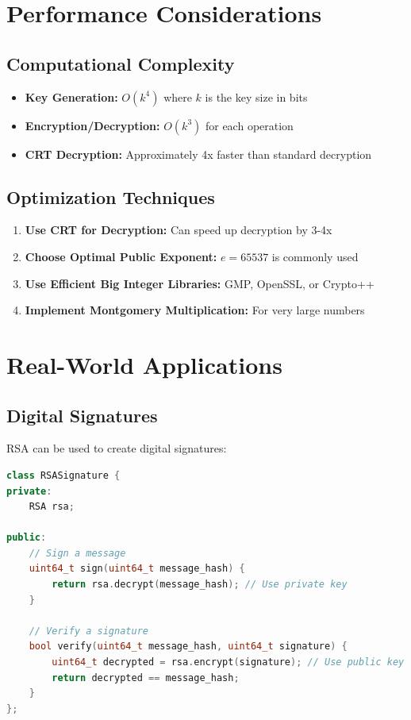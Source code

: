 \documentclass[11pt,a4paper]{article}
\begin{document}
\section{Performance Considerations}

\subsection{Computational Complexity}

\begin{itemize}
    \item \textbf{Key Generation:} $O(k^4)$ where $k$ is the key size in bits
    \item \textbf{Encryption/Decryption:} $O(k^3)$ for each operation
    \item \textbf{CRT Decryption:} Approximately 4x faster than standard decryption
\end{itemize}

\subsection{Optimization Techniques}

\begin{enumerate}
    \item \textbf{Use CRT for Decryption:} Can speed up decryption by 3-4x
    \item \textbf{Choose Optimal Public Exponent:} $e = 65537$ is commonly used
    \item \textbf{Use Efficient Big Integer Libraries:} GMP, OpenSSL, or Crypto++
    \item \textbf{Implement Montgomery Multiplication:} For very large numbers
\end{enumerate}

\section{Real-World Applications}

\subsection{Digital Signatures}

RSA can be used to create digital signatures:

\begin{lstlisting}[language=C++, caption=RSA Digital Signature]
class RSASignature {
private:
    RSA rsa;
    
public:
    // Sign a message
    uint64_t sign(uint64_t message_hash) {
        return rsa.decrypt(message_hash); // Use private key
    }
    
    // Verify a signature
    bool verify(uint64_t message_hash, uint64_t signature) {
        uint64_t decrypted = rsa.encrypt(signature); // Use public key
        return decrypted == message_hash;
    }
};
\end{lstlisting}
\end{document}
